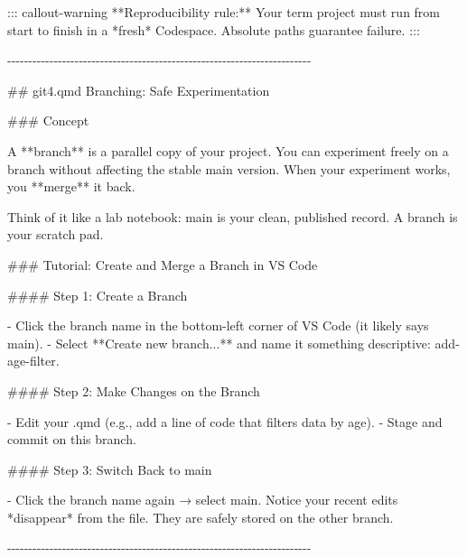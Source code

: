 \documentclass[
  letterpaper,
  DIV=11,
  numbers=noendperiod,
  oneside]{scrreprt}
\newenvironment{Shaded}{\begin{snugshade}}{\end{snugshade}}
\newcommand{\FunctionTok}[1]{\textcolor[rgb]{0.28,0.35,0.67}{#1}}
\newcommand{\InformationTok}[1]{\textcolor[rgb]{0.37,0.37,0.37}{#1}}
\newcommand{\NormalTok}[1]{\textcolor[rgb]{0.00,0.23,0.31}{#1}}
\newcommand{\SpecialStringTok}[1]{\textcolor[rgb]{0.13,0.47,0.30}{#1}}
\begin{document}
\begin{Shaded}
\begin{Highlighting}[numbers=left,,]
\NormalTok{::: callout{-}warning}
\NormalTok{**Reproducibility rule:** Your term project must run from start to finish in a *fresh* Codespace. Absolute paths guarantee failure.}
\NormalTok{:::}

\NormalTok{{-}{-}{-}{-}{-}{-}{-}{-}{-}{-}{-}{-}{-}{-}{-}{-}{-}{-}{-}{-}{-}{-}{-}{-}{-}{-}{-}{-}{-}{-}{-}{-}{-}{-}{-}{-}{-}{-}{-}{-}{-}{-}{-}{-}{-}{-}{-}{-}{-}{-}{-}{-}{-}{-}{-}{-}{-}{-}{-}{-}{-}{-}{-}{-}{-}{-}{-}{-}{-}{-}{-}{-}}

\FunctionTok{\#\# \textasciigrave{}git4.qmd\textasciigrave{} Branching: Safe Experimentation}

\FunctionTok{\#\#\# Concept}

\NormalTok{A **branch** is a parallel copy of your project. You can experiment freely on a branch without affecting the stable \textasciigrave{}main\textasciigrave{} version. When your experiment works, you **merge** it back.}

\NormalTok{Think of it like a lab notebook: }\InformationTok{\textasciigrave{}main\textasciigrave{}}\NormalTok{ is your clean, published record. A branch is your scratch pad.}

\FunctionTok{\#\#\# Tutorial: Create and Merge a Branch in VS Code}

\FunctionTok{\#\#\#\# Step 1: Create a Branch}

\SpecialStringTok{{-}   }\NormalTok{Click the branch name in the bottom{-}left corner of VS Code (it likely says }\InformationTok{\textasciigrave{}main\textasciigrave{}}\NormalTok{).}
\SpecialStringTok{{-}   }\NormalTok{Select **Create new branch...** and name it something descriptive: }\InformationTok{\textasciigrave{}add{-}age{-}filter\textasciigrave{}}\NormalTok{.}

\FunctionTok{\#\#\#\# Step 2: Make Changes on the Branch}

\SpecialStringTok{{-}   }\NormalTok{Edit your }\InformationTok{\textasciigrave{}.qmd\textasciigrave{}}\NormalTok{ (e.g., add a line of code that filters data by age).}
\SpecialStringTok{{-}   }\NormalTok{Stage and commit on this branch.}

\FunctionTok{\#\#\#\# Step 3: Switch Back to \textasciigrave{}main\textasciigrave{}}

\SpecialStringTok{{-}   }\NormalTok{Click the branch name again → select }\InformationTok{\textasciigrave{}main\textasciigrave{}}\NormalTok{. Notice your recent edits *disappear* from the file. They are safely stored on the other branch.}


\NormalTok{{-}{-}{-}{-}{-}{-}{-}{-}{-}{-}{-}{-}{-}{-}{-}{-}{-}{-}{-}{-}{-}{-}{-}{-}{-}{-}{-}{-}{-}{-}{-}{-}{-}{-}{-}{-}{-}{-}{-}{-}{-}{-}{-}{-}{-}{-}{-}{-}{-}{-}{-}{-}{-}{-}{-}{-}{-}{-}{-}{-}{-}{-}{-}{-}{-}{-}{-}{-}{-}{-}{-}{-}}


\end{Highlighting}
\end{Shaded}
\end{document}
